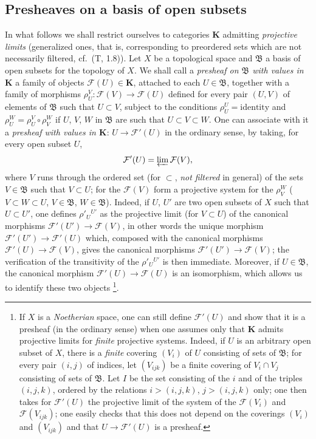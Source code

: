 \subsection{Presheaves on a basis of open subsets}
\label{subsection:0.3.2}

\begin{env}[3.2.1]
\label{0.3.2.1}
In what follows we shall restrict ourselves to categories $\boldsymbol{K}$
admitting \emph{projective limits} (generalized ones, that is,
corresponding to preordered sets which are not necessarily filtered,
cf.\ (T, 1.8)). Let $X$ be a topological space and $\mathfrak{B}$ a basis
of open subsets for the topology of $X$. We shall call a \emph{presheaf on
$\mathfrak{B}$ with values in $\boldsymbol{K}$} a family of objects
$\mathcal{F}(U)\in\boldsymbol{K}$, attached to each $U\in\mathfrak{B}$, together with a
family of morphisms
$\rho_U^V:\mathcal{F}(V)\to\mathcal{F}(U)$ defined for every pair $(U,V)$
of elements of $\mathfrak{B}$ such that $U\subset V$,
subject to the conditions $\rho_U^U=\text{identity}$ and
$\rho_U^W=\rho_U^V\circ\rho_V^W$ if $U$, $V$, $W$ in $\mathfrak{B}$ are
such that $U\subset V\subset W$. One can associate with it a \emph{presheaf with
values in $\boldsymbol{K}$}: $U\to\mathcal{F}'(U)$ in the ordinary sense, by
taking, for every open subset $U$,
\[
  \mathcal{F}'(U)=\varprojlim\mathcal{F}(V),
\]
where $V$ runs through the ordered set (for $\subset$, \emph{not filtered} in
general) of the sets $V\in\mathfrak{B}$ such that $V\subset U$; for the
$\mathcal{F}(V)$ form a projective system for the $\rho_V^W$
($V\subset W\subset U$, $V\in\mathfrak{B}$, $W\in\mathfrak{B}$). Indeed,
if $U$, $U'$ are two open subsets of $X$ such that $U\subset U'$, one defines
$\rho'_U{}^{U'}$ as the projective limit (for $V\subset U$) of the canonical morphisms
$\mathcal{F}'(U')\to\mathcal{F}(V)$, in other words the unique
morphism $\mathcal{F}'(U')\to\mathcal{F}'(U)$ which, composed with the
canonical morphisms $\mathcal{F}'(U)\to\mathcal{F}(V)$, gives the canonical
morphisms $\mathcal{F}'(U')\to\mathcal{F}(V)$; the verification of the
transitivity of the $\rho'_U{}^{U'}$ is then immediate. Moreover, if
$U\in\mathfrak{B}$, the canonical morphism
$\mathcal{F}'(U)\to\mathcal{F}(U)$ is an isomorphism, which allows us to identify
these two objects%
\footnote{If $X$ is a \emph{Noetherian} space, one can still define
$\mathcal{F}'(U)$ and show that it is a presheaf (in the ordinary sense)
when one assumes only that $\boldsymbol{K}$ admits projective limits
for \emph{finite} projective systems. Indeed, if $U$ is an arbitrary open subset
of $X$, there is a \emph{finite} covering $(V_i)$ of $U$ consisting
of sets of $\mathfrak{B}$; for every pair $(i,j)$ of indices, let
$(V_{ijk})$ be a finite covering of $V_i\cap V_j$ consisting of sets of
$\mathfrak{B}$. Let $I$ be the set consisting of the $i$ and of the triples $(i,j,k)$,
ordered by the relations $i>(i,j,k)$, $j>(i,j,k)$ only; one then takes
for $\mathcal{F}'(U)$ the projective limit of the system of the $\mathcal{F}(V_i)$
and $\mathcal{F}(V_{ijk})$; one easily checks that this does not depend on the
coverings $(V_i)$ and $(V_{ijk})$ and that $U\to\mathcal{F}'(U)$ is a
presheaf.}.
\end{env}

